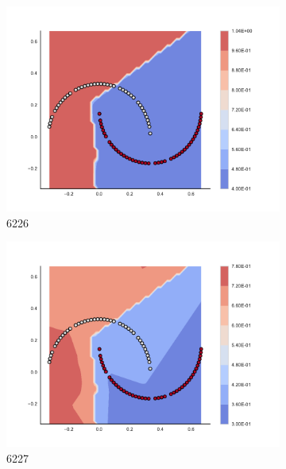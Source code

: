 \begin{figure}[h]
\begin{subfigure}[b]{0.09\textwidth}
    \includegraphics[clip, trim=2.35cm 1.75cm 4.5cm 0cm,width=\textwidth]{img/convergence/6226.pdf}
    \caption{6226}
    \label{fig:convergence_6226}
\end{subfigure}
%
\begin{subfigure}[b]{0.09\textwidth}
    \includegraphics[clip, trim=2.35cm 1.75cm 4.5cm 0cm,width=\textwidth]{img/convergence/6227.pdf}
    \caption{6227}
    \label{fig:convergence_6227}
\end{subfigure}
%
\begin{subfigure}[b]{0.09\textwidth}

\end{subfigure}
\end{figure}
